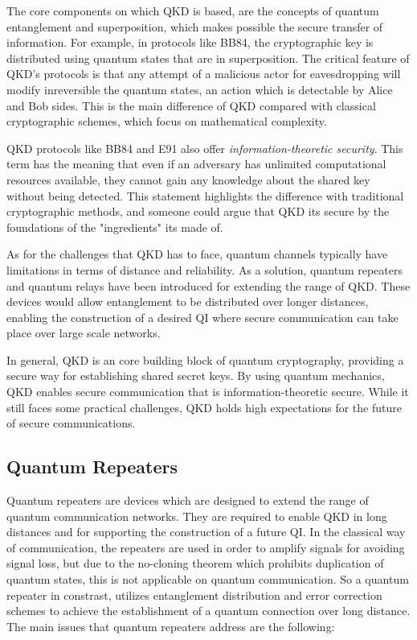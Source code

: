 \documentclass[12pt]{ieeetj}
\begin{document}
		The core components on which QKD is based, are the concepts of quantum entanglement and superposition,
		which makes possible the secure transfer of information. 
		For example, in protocols like BB84, the cryptographic key is distributed using quantum states
		that are in superposition. The critical feature of QKD's protocols is that any attempt of a malicious actor for
		eavesdropping will modify inreversible the quantum states, an action which is detectable by Alice and Bob sides.
		This is the main difference of QKD compared with classical cryptographic schemes, which focus on mathematical complexity. 

		QKD protocols like BB84 and E91 also offer \textit{information-theoretic security}. This term has the meaning that even 
		if an adversary has unlimited computational resources available, they cannot gain any knowledge about the 
		shared key without being detected. This statement highlights the difference with traditional cryptographic methods, and 
		someone could argue that QKD its secure by the foundations of the "ingredients" its made of.

		As for the challenges that QKD has to face, quantum channels typically have limitations in 
		terms of distance and reliability.
		As a solution, quantum repeaters and quantum relays have been 
		introduced for extending the range of QKD. 
		These devices would allow entanglement to be distributed 
		over longer distances, 
		enabling the construction of a desired QI where secure communication 
		can take place over large scale networks.

		In general, QKD is an core building block of quantum cryptography,
		providing a secure way for establishing shared secret keys. 
		By using quantum mechanics, QKD enables secure communication that is 
		information-theoretic secure. While it still faces some practical challenges, 
		QKD holds high expectations for the 
		future of secure communications.

		\subsection{Quantum Repeaters}
		
		Quantum repeaters are devices which are designed to extend the range of quantum communication networks. They 
		are required to enable QKD in long distances and for supporting the construction of a future QI.
		In the classical way of communication, the repeaters are used in order to amplify signals 
		for avoiding signal loss, but due to the no-cloning theorem which prohibits duplication of quantum states,
		this is not applicable on quantum communication. So a quantum repeater in constrast, utilizes entanglement distribution 
		and error correction schemes to achieve the establishment of a quantum connection over long distance.
		The main issues that quantum repeaters address are the following:
\end{document}

